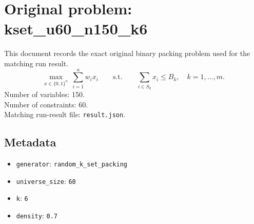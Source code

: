 \documentclass[11pt]{article}
\begin{document}
\section*{Original problem: kset\_u60\_n150\_k6}
This document records the exact original binary packing problem used for the matching run result.
\[
\max_{x\in\{0,1\}^n}\ \sum_{i=1}^n w_i x_i
\qquad\text{s.t.}\qquad
\sum_{i\in S_k} x_i \le B_k,\quad k=1,\dots,m.
\]
Number of variables: 150.\\
Number of constraints: 60.\\
Matching run-result file: \texttt{result.json}.
\subsection*{Metadata}
\begin{itemize}
\item \texttt{generator}: \texttt{random\_k\_set\_packing}
\item \texttt{universe\_size}: \texttt{60}
\item \texttt{k}: \texttt{6}
\item \texttt{density}: \texttt{0.7}
\end{itemize}
\end{document}
